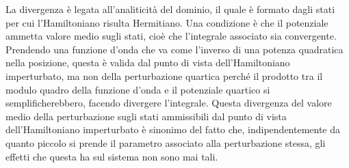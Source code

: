 \documentclass[11pt, a4paper]{scrartcl}
\numberwithin{equation}{subsection}
\theoremstyle{style1}
\begin{document}
La divergenza \`e legata all'analiticit\`a del dominio, il quale \`e formato dagli stati per cui l'Hamiltoniano risulta Hermitiano.
Una condizione \`e che il potenziale ammetta valore medio sugli stati, cio\`e che l'integrale associato sia convergente. 
Prendendo una funzione d'onda che va come l'inverso di una potenza quadratica nella posizione, questa \`e valida dal punto di vista dell'Hamiltoniano imperturbato, ma non della perturbazione quartica perch\'e il prodotto tra il modulo quadro della funzione d'onda e il potenziale quartico si semplificherebbero, facendo divergere l'integrale.
Questa divergenza del valore medio della perturbazione sugli stati ammissibili dal punto di vista dell'Hamiltoniano imperturbato \`e sinonimo del fatto che, indipendentemente da quanto piccolo si prende il parametro associato alla perturbazione stessa, gli effetti che questa ha sul sistema non sono mai tali.
\end{document}
